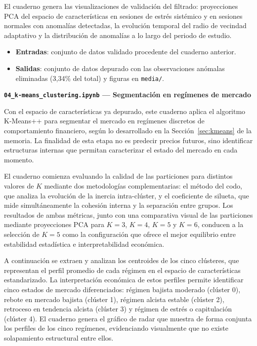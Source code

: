 El cuaderno genera las visualizaciones de validación del filtrado: proyecciones PCA del espacio de características en sesiones de estrés sistémico y en sesiones normales con anomalías detectadas, la evolución temporal del radio de vecindad adaptativo y la distribución de anomalías a lo largo del periodo de estudio.

\begin{itemize}
    \item \textbf{Entradas}: conjunto de datos validado procedente del cuaderno anterior.
    \item \textbf{Salidas}: conjunto de datos depurado con las observaciones anómalas eliminadas (3,34\% del total) y figuras en \texttt{media/}.
\end{itemize}

\textbf{\texttt{04\_k-means\_clustering.ipynb} --- Segmentación en regímenes de mercado}

Con el espacio de características ya depurado, este cuaderno aplica el algoritmo K-Means++ para segmentar el mercado en regímenes discretos de comportamiento financiero, según lo desarrollado en la Sección~\ref{sec:kmeans} de la memoria. La finalidad de esta etapa no es predecir precios futuros, sino identificar estructuras internas que permitan caracterizar el estado del mercado en cada momento.

El cuaderno comienza evaluando la calidad de las particiones para distintos valores de $K$ mediante dos metodologías complementarias: el método del codo, que analiza la evolución de la inercia intra-clúster, y el coeficiente de silueta, que mide simultáneamente la cohesión interna y la separación entre grupos. Los resultados de ambas métricas, junto con una comparativa visual de las particiones mediante proyecciones PCA para $K=3$, $K=4$, $K=5$ y $K=6$, conducen a la selección de $K=5$ como la configuración que ofrece el mejor equilibrio entre estabilidad estadística e interpretabilidad económica.

A continuación se extraen y analizan los centroides de los cinco clústeres, que representan el perfil promedio de cada régimen en el espacio de características estandarizado. La interpretación económica de estos perfiles permite identificar cinco estados de mercado diferenciados: régimen bajista moderado (clúster 0), rebote en mercado bajista (clúster 1), régimen alcista estable (clúster 2), retroceso en tendencia alcista (clúster 3) y régimen de estrés o capitulación (clúster 4). El cuaderno genera el gráfico de radar que muestra de forma conjunta los perfiles de los cinco regímenes, evidenciando visualmente que no existe solapamiento estructural entre ellos.

